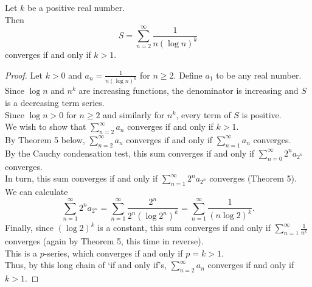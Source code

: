 \documentclass{article}
\newenvironment{theorem}[1]{\renewcommand\theinnercustomthm{#1}\innercustomthm}
  {\endinnercustomthm}
\begin{document}
\newpage{}
\begin{theorem}{3}
Let $k$ be a positive real number. \\
Then \[
S=\sum\limits_{n=2}^\infty \frac{1}{n(\log n)^k}
\]
converges if and only if $k > 1$.
\end{theorem}
\begin{proof}
    Let $k >0$ and $a_n = \frac{1}{n(\log n)^k}$ for $n \ge 2$. Define $a_1$ to be any real number. \\
    Since $\log n$ and $n^k$ are increasing functions, the denominator is increasing and $S$ is a decreasing term series. \\
    Since $\log n>0$ for $n \ge 2$ and similarly for $n^k$, every term of $S$ is positive. \\
    We wish to show that $\sum\limits_{n=2}^\infty a_n$ converges if and only if $k > 1$. \\
    By Theorem 5 below, $\sum\limits_{n=2}^\infty a_n$ converges if and only if $\sum\limits_{n=1}^\infty a_n$ converges. \\
    By the Cauchy condensation test, this sum converges if and only if
    $\sum\limits_{n=0}^\infty 2^na_{2^n}$
    converges. \\
    In turn, this sum converges if and only if $\sum\limits_{n=1}^\infty 2^n a_{2^n}$ converges (Theorem 5). \\
    We can calculate
    \[
    \sum\limits_{n=1}^\infty 2^n a_{2^n} = \sum\limits_{n=1}^\infty \frac{2^n}{2^n (\log 2^n)^k} =\sum\limits_{n=1}^\infty \frac{1}{(n\log 2)^k }.
    \]
    Finally, since $(\log 2)^k$ is a constant, this sum converges if and only if $\sum\limits_{n=1}^\infty \frac{1}{n^k}$ converges (again by Theorem 5, this time in reverse). \\
    This is a $p$-series, which converges if and only if $p = k > 1$. \\
    Thus, by this long chain of `if and only if's, $\sum\limits_{n=2}^\infty a_n$ converges if and only if $k > 1$.
\end{proof}
\end{document}
